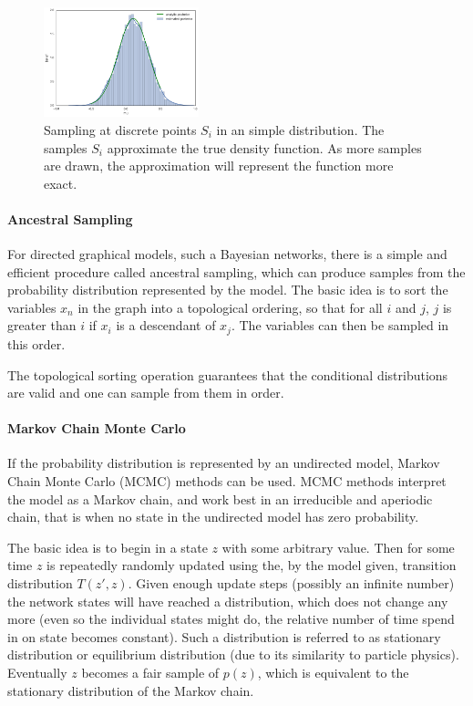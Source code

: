 \begin{figure}
	\centering
    	\includegraphics[width=0.4\textwidth]{imgs/sampling.png} 
    \caption{Sampling at discrete points $S_i$ in an simple distribution. The samples $S_i$ approximate the true density function. As more samples are drawn, the approximation will represent the function more exact.}
	\label{fig:Sampling}
\end{figure}



\paragraph{Ancestral Sampling} For directed graphical models, such a Bayesian networks, there is a simple and efficient procedure called ancestral sampling, which can produce samples from the probability distribution represented by the model. 
The basic idea is to sort the variables $x_n$ in the graph into a topological ordering, so that for all $i$ and $j$, $j$ is greater than $i$ if $x_i$ is a descendant of $x_j$. The variables can then be sampled in this order.

The topological sorting operation guarantees that the conditional distributions are valid and one can sample from them in order.

\paragraph{Markov Chain Monte Carlo} If the probability distribution is represented by an undirected model, Markov Chain Monte Carlo (MCMC) methods can be used. 
MCMC methods interpret the model as a Markov chain, and work best in an irreducible and aperiodic chain, that is when no state in the undirected model has zero probability.

The basic idea is to begin in a state $z$ with some arbitrary value. 
Then for some time $z$ is repeatedly randomly updated using the, by the model given, transition distribution $T(z',z)$. 
Given enough update steps (possibly an infinite number) the network states will have reached a distribution, which does not change any more (even so the individual states might do, the relative number of time spend in on state becomes constant).
Such a distribution is referred to as stationary distribution or equilibrium distribution (due to its similarity to particle physics).
Eventually $z$ becomes a fair sample of $p(z)$, which is equivalent to the stationary distribution of the Markov chain.


